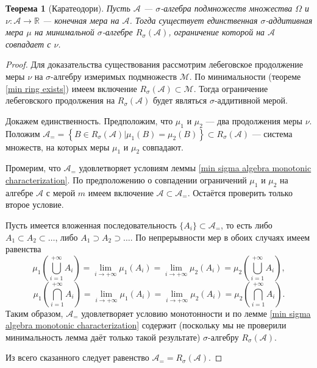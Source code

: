 \documentclass[12pt]{article}
\newtheorem{theorem}{Теорема}
\numberwithin{theorem}{section}
\theoremstyle{definition}
\newcommand{\RR}{\mathbb{R}}
\newcommand{\calA}{\mathcal{A}}
\newcommand{\calM}{\mathcal{M}}
\newcommand{\defineset}[2]{\left\{
	\left.
	#1
	\right\vert
	#2
	\right\}}
\begin{document}
	\begin{theorem}[Каратеодори] \label{uniqueness of extention to the minimal sigma algebra}
		Пусть $ \calA $ --- $ \sigma $-алгебра подмножеств множества $ \Omega $
		и $ \nu \colon \calA \to \RR $ --- конечная мера на $ \calA $.
		Тогда существует единственная $ \sigma $-аддитивная мера $ \mu $ 
		на минимальной $ \sigma $-алгебре $ R_{\sigma}(\calA) $,
		ограничение которой на $ \calA $ совпадает с $ \nu $.
	\end{theorem}
	
	\begin{proof}
		Для доказательства существования рассмотрим лебеговское продолжение меры $ \nu $ на $ \sigma $-алгебру измеримых подмножеств $ \calM $.
		По минимальности (теореме \ref{min ring exists}) имеем включение $ R_{\sigma}(\calA) \subset \calM $.
		Тогда ограничение лебеговского продолжения на $ R_{\sigma}(\calA) $ будет являться $ \sigma $-аддитивной мерой.
		
		Докажем единственность. Предположим, что $ \mu_1 $ и $ \mu_2 $ --- два продолжения меры $ \nu $.
		Положим $ \calA_{=} = \defineset{B \in R_{\sigma}(\calA)}{\mu_1(B) = \mu_2(B)} \subset R_{\sigma}(\calA) $ 
		--- система множеств, на которых меры $ \mu_1 $ и $ \mu_2 $ совпадают.
	
		Промерим, что $ \calA_{=} $ удовлетворяет условиям леммы \ref{min sigma algebra monotonic characterization}.
		По предположению о совпадении ограничений $ \mu_1 $ и $ \mu_2 $ на алгебре $ \calA $ с мерой $ m $ 
		имеем включение $ \calA \subset \calA_{=} $.
		Остаётся проверить только второе условие.
		
		Пусть имеется вложенная последовательность $ \{A_i\} \subset \calA_{=} $,
		то есть либо $ A_1 \subset A_2 \subset \ldots $, либо $ A_1 \supset A_2 \supset \ldots $.
		По непрерывности мер в обоих случаях имеем равенства
		$$ \mu_1\left(\bigcup\limits_{i = 1}^{+\infty} A_i\right)
		= \lim\limits_{i \to +\infty} \mu_1(A_i) 
		= \lim\limits_{i \to +\infty} \mu_2(A_i)
		= \mu_2\left(\bigcup\limits_{i = 1}^{+\infty} A_i\right), $$
		$$ \mu_1\left(\bigcap\limits_{i = 1}^{+\infty} A_i\right)
		= \lim\limits_{i \to +\infty} \mu_1(A_i) 
		= \lim\limits_{i \to +\infty} \mu_2(A_i)
		= \mu_2\left(\bigcap\limits_{i = 1}^{+\infty} A_i\right). $$
		Таким образом, $ \calA_{=} $ удовлетворяет условию монотонности и по лемме \ref{min sigma algebra monotonic characterization} содержит (поскольку мы не проверили минимальность лемма даёт только такой результате) 
		$ \sigma $-алгебру $ R_{\sigma}(\calA) $.
		
		Из всего сказанного следует равенство $ \calA_{=} = R_{\sigma}(\calA) $.
	\end{proof}
	
\end{document}
